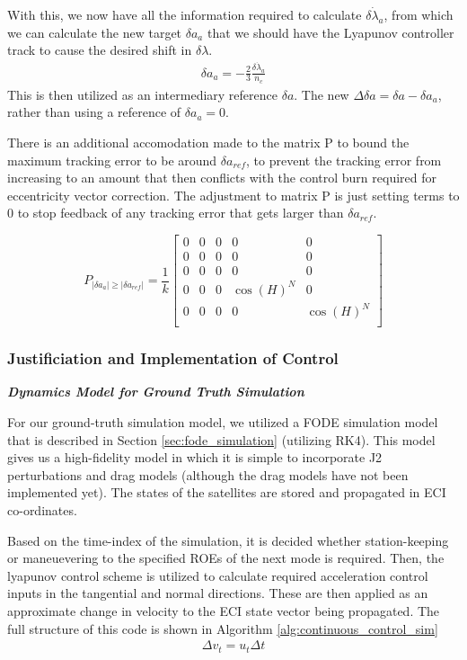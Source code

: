 With this, we now have all the information required to calculate $\delta \dot{\lambda}_a $, from which we can calculate the new target $\delta a_a$ that we should have the Lyapunov controller track to cause the desired shift in $\delta \lambda$.
\begin{align}
    \delta a_a = -\frac{2}{3}\frac{\delta \dot{\lambda}_a}{n_c}
\end{align}
This is then utilized as an intermediary reference $\delta a$. The new $\Delta \delta a = \delta a - \delta a_a$, rather than using a reference of $\delta a_a = 0$.

There is an additional accomodation made to the matrix P to bound the maximum tracking error to be around $\delta a_{ref}$, to prevent the tracking error from increasing to an amount that then conflicts with the control burn required for eccentricity vector correction. The adjustment to matrix P is just setting terms to $0$ to stop feedback of any tracking error that gets larger than $\delta a_{ref}$.

\[
P_{|\delta a_a| \geq |\delta a_{ref}|} = \frac{1}{k} \begin{bmatrix}
0 & 0 & 0 & 0 & 0 \\
0 & 0 & 0 & 0 & 0 \\
0 & 0 & 0 & 0 & 0 \\
0 & 0 & 0 & \cos(H)^N & 0 \\
0 & 0 & 0 & 0 & \cos(H)^N \\
\end{bmatrix}
\]

\subsubsection{Justificiation and Implementation of Control}

\textbf{\textit{Dynamics Model for Ground Truth Simulation}}

For our ground-truth simulation model, we utilized a FODE simulation model that is described in Section \ref{sec:fode_simulation} (utilizing RK4). This model gives us a high-fidelity model in which it is simple to incorporate J2 perturbations and drag models (although the drag models have not been implemented yet). The states of the satellites are stored and propagated in ECI co-ordinates. 

Based on the time-index of the simulation, it is decided whether station-keeping or maneuevering to the specified ROEs of the next mode is required. Then, the lyapunov control scheme is utilized to calculate required acceleration control inputs in the tangential and normal directions. These are then applied as an approximate change in velocity to the ECI state vector being propagated. The full structure of this code is shown in Algorithm \ref{alg:continuous_control_sim}
\begin{align}
    \Delta v_t = u_t \Delta t
\end{align}

